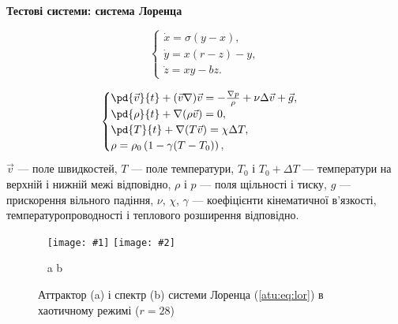 \documentclass[14pt,handout,utf8]{beamer}
\newcommand{\Xhead}[1]{
 \begin{center}%
      \textbf{#1}%
 \end{center}%
}
\newcommand{\ABlbl}{%
  \vspace{-2.9ex}
  \begin{center}
    ~ \hfill a \hfill\hfill b \hfill ~
  \end{center}
  \vspace{-2.0ex}
}
\newcommand{\PicDouble}[2]{%
 \begin{center}
    ~ \hfill
    \texttt{[image: \#1]}
    \hfill
    \texttt{[image: \#2]}
    \hfill ~
  \end{center}
  \ABlbl
}
\begin{document}


\begin{frame}
  \frametitle{~}

  \Xhead{Тестові системи: система Лоренца}

  \begin{equation}
    \begin{cases}
      \dot{x} = \sigma (y-x ) , \\
      \dot{y} = x (r-z) - y , \\
      \dot{z} = x y - b z .
    \end{cases}
    \label{atu:eq:lor}
  \end{equation}

  \begin{equation}
    \begin{cases}
      \pd{\vec{v}}{t} + ( \vec{v} \nabla ) \vec{v} = - \frac{\nabla p}{\rho} + \nu \Delta \vec{v} + \vec{g}, \\
      \pd{\rho}{t} + \nabla ( \rho \vec{v} ) = 0 , \\
      \pd{T}{t} +\nabla ( T \vec{v} ) = \chi \Delta T , \\
      \rho = \rho_0 \left( 1 - \gamma (T - T_0) \right) ,
    \end{cases}
    \label{atu:eq:lor_gidro}
  \end{equation}
  $\Vec{v} $ --- поле швидкостей,
  $T $ --- поле температури,
  $T_0 $ і $ T_0 + \Delta T $ --- температури на верхній і нижній межі відповідно,
  $\rho $ і $ p $ --- поля щільності і тиску,
  $g $ --- прискорення вільного падіння,
  $\nu $,
  $\chi $,
  $\gamma $ --- коефіцієнти кінематичної в'язкості,
  температуропроводності і теплового розширення відповідно.

  \begin{figure}
    \PicDouble{../p5/p/cha/lor/lor0-p_xyz_r=028.png}{../p5/p/cha/lor/lor0_fft-p_f_r=028.png}
    \caption{Аттрактор (a) і спектр (b) системи Лоренца (\ref{atu:eq:lor}) в хаотичному режимі ($r = 28$)}
    \label{atu:f:lor_attractor_phase_chaos28}
  \end{figure}


\end{frame}

\end{document}
